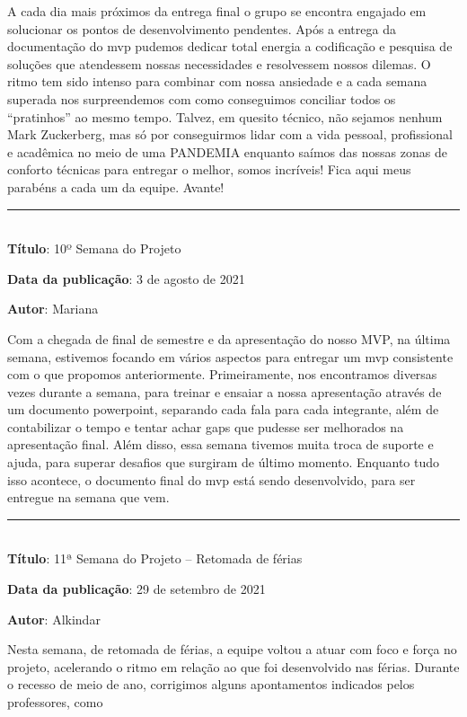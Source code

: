 A cada dia mais próximos da entrega final o grupo se encontra engajado em solucionar os pontos de desenvolvimento pendentes. Após a entrega da documentação do \gls{mvp} pudemos dedicar total energia a codificação e pesquisa de soluções que atendessem nossas necessidades e resolvessem nossos dilemas. O ritmo tem sido intenso para combinar com nossa ansiedade e a cada semana superada nos surpreendemos com como conseguimos conciliar todos os ``pratinhos'' ao mesmo tempo. Talvez, em quesito técnico, não sejamos nenhum Mark Zuckerberg, mas só por conseguirmos lidar com a vida pessoal, profissional e acadêmica no meio de uma PANDEMIA enquanto saímos das nossas zonas de conforto técnicas para entregar o melhor, somos incríveis! Fica aqui meus parabéns a cada um da equipe. Avante! \\

\protect\rule{13cm}{.5pt}
\\

\textbf{Título}: 10º Semana do Projeto

\textbf{Data da publicação}: 3 de agosto de 2021

\textbf{Autor}: Mariana

Com a chegada de final de semestre e da apresentação do nosso MVP, na última semana, estivemos focando em vários aspectos para entregar um \gls{mvp} consistente com o que propomos anteriormente. Primeiramente, nos encontramos diversas vezes durante a semana, para treinar e ensaiar a nossa apresentação através de um documento powerpoint, separando cada fala para cada integrante, além de contabilizar o tempo e tentar achar gaps que pudesse ser melhorados na apresentação final. Além disso, essa semana tivemos muita troca de suporte e ajuda, para superar desafios que surgiram de último momento. Enquanto tudo isso acontece, o documento final do mvp está sendo desenvolvido, para ser entregue na semana que vem. \\

\protect\rule{13cm}{.5pt}
\\

\textbf{Título}: 11ª Semana do Projeto -- Retomada de férias

\textbf{Data da publicação}: 29 de setembro de 2021

\textbf{Autor}: Alkindar

Nesta semana, de retomada de férias, a equipe voltou a atuar com foco e força no projeto, acelerando o ritmo em relação ao que foi desenvolvido nas férias. Durante o recesso de meio de ano, corrigimos alguns apontamentos indicados pelos professores, como 

